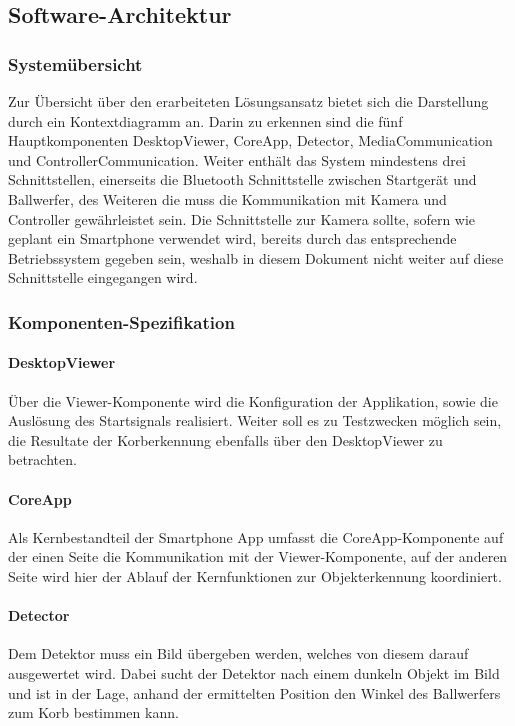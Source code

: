 \subsection{Software-Architektur}
	\subsubsection{Systemübersicht}
	Zur Übersicht über den erarbeiteten Lösungsansatz bietet sich die Darstellung durch ein Kontextdiagramm an. Darin zu erkennen sind die fünf Hauptkomponenten  DesktopViewer, CoreApp, Detector, MediaCommunication und ControllerCommunication. Weiter enthält das System mindestens drei Schnittstellen, einerseits die Bluetooth Schnittstelle zwischen Startgerät und Ballwerfer, des Weiteren die muss die Kommunikation mit Kamera und Controller gewährleistet sein. Die Schnittstelle zur Kamera sollte, sofern wie geplant ein Smartphone verwendet wird, bereits durch das entsprechende Betriebssystem gegeben sein, weshalb in diesem Dokument nicht weiter auf diese Schnittstelle eingegangen wird.
	
	\subsubsection{Komponenten-Spezifikation}
		\paragraph{DesktopViewer}
		Über die Viewer-Komponente wird die Konfiguration der Applikation, sowie die Auslösung des Startsignals realisiert. Weiter soll es zu Testzwecken möglich sein, die Resultate der Korberkennung ebenfalls über den DesktopViewer zu betrachten.
		
		\paragraph{CoreApp}
		Als Kernbestandteil der Smartphone App umfasst die CoreApp-Komponente auf der einen Seite die Kommunikation mit der Viewer-Komponente, auf der anderen Seite wird hier der Ablauf der Kernfunktionen zur Objekterkennung koordiniert.
		
		\paragraph{Detector}
		Dem Detektor muss ein Bild übergeben werden, welches von diesem darauf ausgewertet wird. Dabei sucht der Detektor nach einem dunkeln Objekt im Bild und ist in der Lage, anhand der ermittelten Position den Winkel des Ballwerfers zum Korb bestimmen kann.
		
